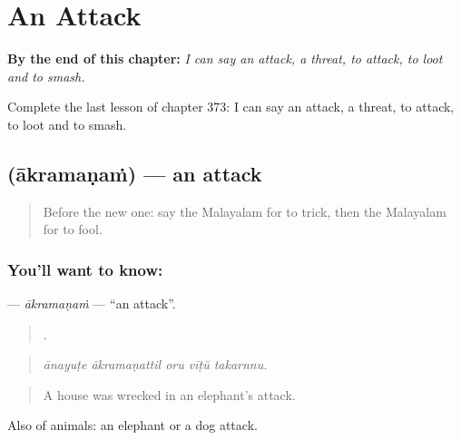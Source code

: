 
\chapter{An Attack}
\label{ch:ml-an-attack}

\begin{chapteropening}
\textbf{By the end of this chapter:} \emph{I can say an attack, a threat, to attack, to loot and to smash.}

Complete the last lesson of chapter 373: I can say an attack, a threat, to attack, to loot and to smash.
\end{chapteropening}

\section[\texorpdfstring{\ml{ആക്രമണം} (ākramaṇaṁ)}{ആക്രമണം (ākramaṇaṁ)}]{ (ākramaṇaṁ) — an attack}

\label{lesson:ML-C373-akramanam}



\begin{quote}
Before the new one: say the Malayalam for to trick, then the Malayalam for to fool.
\end{quote}

\subsection*{You'll want to know: }
\textbf{} — \emph{ākramaṇaṁ} — \textquotedblleft{}an attack\textquotedblright{}.

\begin{quote}
    .
\end{quote}

\begin{quote}
\emph{ānayuṭe ākramaṇattil oru vīṭŭ takarnnu.}
\end{quote}

\begin{quote}
A house was wrecked in an elephant's attack.
\end{quote}

Also of animals: an elephant or a dog attack.

